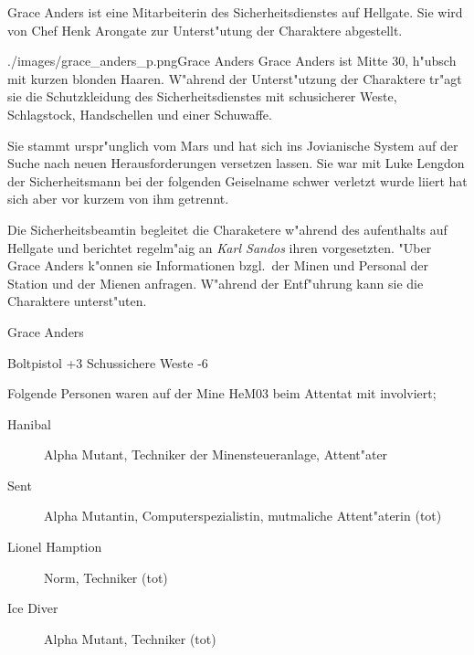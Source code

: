 Grace Anders ist eine Mitarbeiterin des Sicherheitsdienstes auf Hellgate. Sie wird von Chef Henk Arongate zur 
Unterst"utung der Charaktere abgestellt. 

\begin{sideimagebox}[l]{0.5}{./images/grace_anders_p.png}{Grace Anders}
    Grace Anders ist Mitte 30, h"ubsch mit kurzen blonden Haaren. W"ahrend der Unterst"utzung der Charaktere tr"agt sie 
    die Schutzkleidung des Sicherheitsdienstes mit schu\3sicherer Weste, Schlagstock, Handschellen und einer Schu\3waffe. 

    Sie stammt urspr"unglich vom Mars und hat sich ins Jovianische System auf der Suche nach neuen Herausforderungen 
    versetzen lassen. Sie war mit Luke Lengdon der Sicherheitsmann bei der folgenden Geiselname schwer verletzt wurde 
    liiert hat sich aber vor kurzem von ihm getrennt.

    Die Sicherheitsbeamtin begleitet die Charaketere w"ahrend des aufenthalts auf Hellgate und berichtet regelm"a\3ig an 
    \emph{Karl Sandos} ihren vorgesetzten. "Uber Grace Anders k"onnen sie Informationen bzgl.~der Minen und Personal der 
    Station und der Mienen anfragen. W"ahrend der Entf"uhrung kann sie die Charaktere unterst"uten.
\end{sideimagebox}

\begin{nscsheet}{Grace Anders}
    \nscstats[ATT=4,AGG=3,EMP=4,KNO=3,HP=10]
    \nscruler
    \begin{nscinventory}
        \nscitem[Waffen] Boltpistol +3
        \nscitem[R"ustung] Schussichere Weste -6
    \end{nscinventory}
\end{nscsheet}


Folgende Personen waren auf der Mine HeM03 beim Attentat mit involviert;

\begin{description}
    \item[Hanibal] Alpha Mutant, Techniker der Minensteueranlage, Attent"ater
    \item[Sent] Alpha Mutantin, Computerspezialistin, mutma\3liche Attent"aterin (tot)
    \item[Lionel Hamption] Norm, Techniker (tot)
    \item[Ice Diver] Alpha Mutant, Techniker (tot) 
\end{description}


